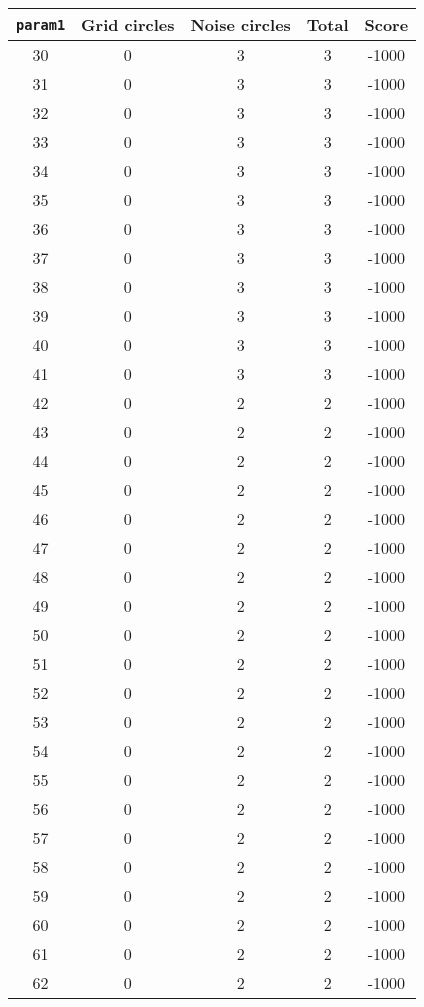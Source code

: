 \documentclass[letterpaper, 12pt]{article}
\begin{document}
\begin{longtable}{|c|c|c|c|c|}
\hline
\textbf{\texttt{param1}} & \textbf{Grid circles} & \textbf{Noise circles} & \textbf{Total} & \textbf{Score} \\
\hline
30 & 0 & 3 & 3 & -1000 \\
\hline
31 & 0 & 3 & 3 & -1000 \\
\hline
32 & 0 & 3 & 3 & -1000 \\
\hline
33 & 0 & 3 & 3 & -1000 \\
\hline
34 & 0 & 3 & 3 & -1000 \\
\hline
35 & 0 & 3 & 3 & -1000 \\
\hline
36 & 0 & 3 & 3 & -1000 \\
\hline
37 & 0 & 3 & 3 & -1000 \\
\hline
38 & 0 & 3 & 3 & -1000 \\
\hline
39 & 0 & 3 & 3 & -1000 \\
\hline
40 & 0 & 3 & 3 & -1000 \\
\hline
41 & 0 & 3 & 3 & -1000 \\
\hline
42 & 0 & 2 & 2 & -1000 \\
\hline
43 & 0 & 2 & 2 & -1000 \\
\hline
44 & 0 & 2 & 2 & -1000 \\
\hline
45 & 0 & 2 & 2 & -1000 \\
\hline
46 & 0 & 2 & 2 & -1000 \\
\hline
47 & 0 & 2 & 2 & -1000 \\
\hline
48 & 0 & 2 & 2 & -1000 \\
\hline
49 & 0 & 2 & 2 & -1000 \\
\hline
50 & 0 & 2 & 2 & -1000 \\
\hline
51 & 0 & 2 & 2 & -1000 \\
\hline
52 & 0 & 2 & 2 & -1000 \\
\hline
53 & 0 & 2 & 2 & -1000 \\
\hline
54 & 0 & 2 & 2 & -1000 \\
\hline
55 & 0 & 2 & 2 & -1000 \\
\hline
56 & 0 & 2 & 2 & -1000 \\
\hline
57 & 0 & 2 & 2 & -1000 \\
\hline
58 & 0 & 2 & 2 & -1000 \\
\hline
59 & 0 & 2 & 2 & -1000 \\
\hline
60 & 0 & 2 & 2 & -1000 \\
\hline
61 & 0 & 2 & 2 & -1000 \\
\hline
62 & 0 & 2 & 2 & -1000 \\

\end{longtable}
\end{document}
